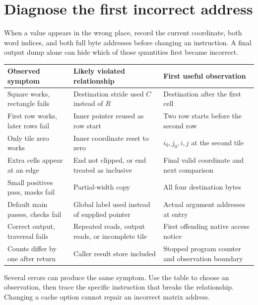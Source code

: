 \section{Diagnose the first incorrect address}\label{transpose-x-failures}
When a value appears in the wrong place, record the current coordinate, both word
indices, and both full byte addresses before changing an instruction. A final
output dump alone can hide which of those quantities first became incorrect.
\begin{longtable}{p{49mm}p{51mm}p{47mm}}
  \toprule
  Observed symptom                  & Likely violated relationship                     & First useful observation                         \\
  \midrule
  Square works, rectangle fails     & Destination stride used \(C\) instead of \(R\)   & Destination after the first cell                 \\
  First row works, later rows fail  & Inner pointer reused as row start                & Two row starts before the second row             \\
  Only tile zero works              & Inner coordinate reset to zero                   & \(i_0,j_0,i,j\) at the second tile               \\
  Extra cells appear at an edge     & End not clipped, or end treated as inclusive     & Final valid coordinate and next comparison       \\
  Small positives pass, masks fail  & Partial-width copy                               & All four destination bytes                       \\
  Default main passes, checks fail  & Global label used instead of supplied pointer    & Actual argument addresses at entry               \\
  Correct output, traversal fails   & Repeated reads, output reads, or incomplete tile & First offending native access notice             \\
  Counts differ by one after return & Caller result store included                     & Stopped program counter and observation boundary \\
  \bottomrule
\end{longtable}
Several errors can produce the same symptom. Use the table to choose an
observation, then trace the specific instruction that breaks the relationship.
Changing a cache option cannot repair an incorrect matrix address.
